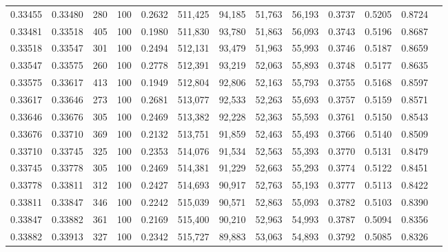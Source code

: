 \begin{tabular}{rrrrrrrrrrrrr}
0.33455 & 0.33480 &   280 & 100 &                                     0.2632 & 511,425 &  94,185 &  51,763 &  56,193 & 0.3737 & 0.5205 & 0.8724 \\
0.33481 & 0.33518 &   405 & 100 &                                     0.1980 & 511,830 &  93,780 &  51,863 &  56,093 & 0.3743 & 0.5196 & 0.8687 \\
0.33518 & 0.33547 &   301 & 100 &                                     0.2494 & 512,131 &  93,479 &  51,963 &  55,993 & 0.3746 & 0.5187 & 0.8659 \\
0.33547 & 0.33575 &   260 & 100 &                                     0.2778 & 512,391 &  93,219 &  52,063 &  55,893 & 0.3748 & 0.5177 & 0.8635 \\
0.33575 & 0.33617 &   413 & 100 &                                     0.1949 & 512,804 &  92,806 &  52,163 &  55,793 & 0.3755 & 0.5168 & 0.8597 \\
0.33617 & 0.33646 &   273 & 100 &                                     0.2681 & 513,077 &  92,533 &  52,263 &  55,693 & 0.3757 & 0.5159 & 0.8571 \\
0.33646 & 0.33676 &   305 & 100 &                                     0.2469 & 513,382 &  92,228 &  52,363 &  55,593 & 0.3761 & 0.5150 & 0.8543 \\
0.33676 & 0.33710 &   369 & 100 &                                     0.2132 & 513,751 &  91,859 &  52,463 &  55,493 & 0.3766 & 0.5140 & 0.8509 \\
0.33710 & 0.33745 &   325 & 100 &                                     0.2353 & 514,076 &  91,534 &  52,563 &  55,393 & 0.3770 & 0.5131 & 0.8479 \\
0.33745 & 0.33778 &   305 & 100 &                                     0.2469 & 514,381 &  91,229 &  52,663 &  55,293 & 0.3774 & 0.5122 & 0.8451 \\
0.33778 & 0.33811 &   312 & 100 &                                     0.2427 & 514,693 &  90,917 &  52,763 &  55,193 & 0.3777 & 0.5113 & 0.8422 \\
0.33811 & 0.33847 &   346 & 100 &                                     0.2242 & 515,039 &  90,571 &  52,863 &  55,093 & 0.3782 & 0.5103 & 0.8390 \\
0.33847 & 0.33882 &   361 & 100 &                                     0.2169 & 515,400 &  90,210 &  52,963 &  54,993 & 0.3787 & 0.5094 & 0.8356 \\
0.33882 & 0.33913 &   327 & 100 &                                     0.2342 & 515,727 &  89,883 &  53,063 &  54,893 & 0.3792 & 0.5085 & 0.8326 \\

\end{tabular}
